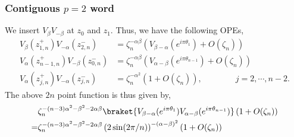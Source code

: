 \documentclass[11pt]{article}
\newcommand{\mO}{\mathcal{O}}
\newcommand{\lb}{\left(}
\newcommand{\rb}{\right)}
\begin{document}
\subsubsection{\texorpdfstring{Contiguous $p=2$ word}{Contiguous p=2 word}}

We insert $V_\beta V_{-\beta}$ at $z_0$ and $z_1$. Thus, we have the following OPEs,
\begin{align}
    V_\beta(z_{1,n}^+) V_{-\alpha}(z_{2,n}^-) &= \zeta_n^{-\alpha \beta} \lb V_{\beta-\alpha} (e^{i\pi \theta_{1}})+ O(\zeta_n)\rb \\
    V_\alpha(z_{n-1,n}^+) V_{-\beta}(z_{0,n}^-) &= \zeta_n^{-\alpha \beta} \lb V_{\alpha-\beta}(e^{i\pi \theta_{n-1}}) + O(\zeta_n)\rb \\
    V_\alpha(z_{j,n}^+) V_{-\alpha}(z_{j,n}^-) &= \zeta_n^{-\alpha ^2} \lb 1 + O(\zeta_n)\rb, \qquad \qquad j = 2, \cdots, n-2.
\end{align}
The above $2n$ point function is thus given by,
\begin{align}
    &\zeta_n^{-(n-3)\alpha^2 -\beta^2 -2\alpha\beta} \braket{V_{\beta-\alpha}(e^{i \pi \theta_1})V_{\alpha - \beta}(e^{i \pi \theta_{n-1}})}\lb 1 + O(\zeta_n)\rb \\
    =& \zeta_n^{-(n-3)\alpha^2 -\beta^2 -2\alpha\beta} \lb2\sin(2\pi/n)\rb^{-(\alpha - \beta)^2} \lb 1+ O(\zeta_n)\rb
\end{align} 
\end{document}
